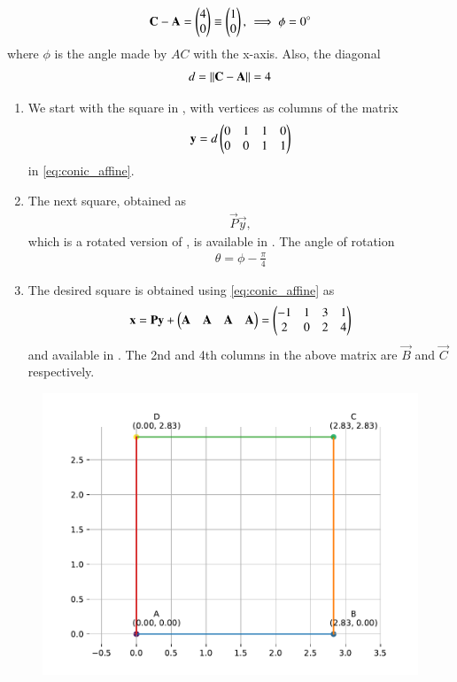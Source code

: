 \begin{align}
\mathbf{C} - \mathbf{A} = \begin{pmatrix}
4\\
0
\end{pmatrix} \equiv 
\begin{pmatrix}
1\\
0
\end{pmatrix},\,
\implies \phi= 0\degree
\end{align}
		where
$\phi$ is the angle made by $AC$ with the x-axis.
Also, the diagonal
\begin{align}
	d = \left\lVert\mathbf{C}-\mathbf{A}\right\rVert = 4
\end{align}
\begin{enumerate}
	\item We start with  the square in ,
 with vertices as columns of the matrix
\begin{align}
\mathbf{y} = d\begin{pmatrix}0 & 1 & 1 & 0 \\ 0 & 0 & 1 & 1\end{pmatrix}
\end{align}
	in \eqref{eq:conic_affine}.
\item The next square, obtained as 
\begin{align}
\vec{P}\vec{y},
\end{align}
which is a rotated version of 
,
is available in 
.  The angle of rotation
\begin{align}
	\theta = \phi - \frac{\pi}{4}
\end{align}
\item The desired square  is obtained using
\eqref{eq:conic_affine} as
\begin{align}
	\mathbf{x}=\mathbf{P}\mathbf{y} + \begin{pmatrix}\mathbf{A} & \mathbf{A} &\mathbf{A} &\mathbf{A}\end{pmatrix} = 
		\begin{pmatrix}
-1  &1 & 3 & 1 \\
2 & 0 & 2 & 4
	\end{pmatrix}
\end{align}
and available in 
. The 2nd and 4th columns in the above matrix are 
$\vec{B}$ and $\vec{C}$ respectively.
\end{enumerate}
\begin{figure}[H]
	\begin{center} 
	    \includegraphics[width=0.75\columnwidth]{chapters/10/7/4/4/figs/fig.pdf}
	\end{center}
\caption{}
\label{fig:7/4/4/4Fig3}
\end{figure}
